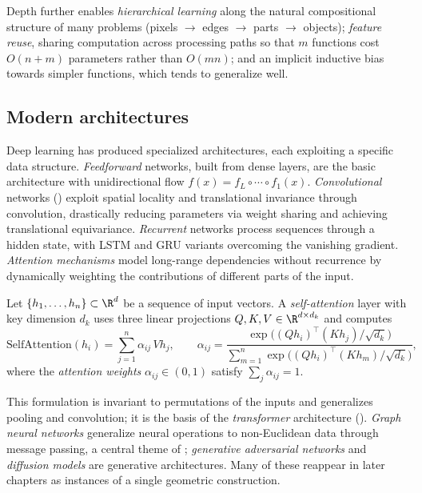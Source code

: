 Depth further enables \emph{hierarchical learning} along the natural
compositional structure of many problems (pixels $\to$ edges $\to$ parts $\to$
objects); \emph{feature reuse}, sharing computation across processing paths so
that $m$ functions cost $O(n + m)$ parameters rather than $O(mn)$; and an
implicit inductive bias towards simpler functions, which tends to generalize
well.

\subsection{Modern architectures}
\label{sec:found:modern}

Deep learning has produced specialized architectures, each exploiting a specific
data structure. \emph{Feedforward} networks, built from dense layers, are the
basic architecture with unidirectional flow $f(x) = f_L \circ \cdots \circ
f_1(x)$. \emph{Convolutional} networks () exploit spatial locality
and translational invariance through convolution, drastically reducing parameters
via weight sharing and achieving translational equivariance. \emph{Recurrent}
networks process sequences through a hidden state, with LSTM and GRU variants
overcoming the vanishing gradient. \emph{Attention mechanisms} model long-range
dependencies without recurrence by dynamically weighting the contributions of
different parts of the input.

\begin{definition}
\label{def:found:attention}
Let $\{h_1, \ldots, h_n\} \subset \R^d$ be a sequence of input vectors. A
\emph{self-attention} layer with key dimension $d_k$ uses three linear
projections $Q, K, V \in \R^{d \times d_k}$ and computes
\[
  \mathrm{SelfAttention}(h_i) = \sum_{j=1}^n \alpha_{ij}\, V h_j, \qquad
  \alpha_{ij} = \frac{\exp\bigl((Qh_i)^\top(Kh_j)/\sqrt{d_k}\bigr)}
  {\sum_{m=1}^n \exp\bigl((Qh_i)^\top(Kh_m)/\sqrt{d_k}\bigr)},
\]
where the \emph{attention weights} $\alpha_{ij} \in (0,1)$ satisfy
$\sum_j \alpha_{ij} = 1$.
\end{definition}

This formulation is invariant to permutations of the inputs and generalizes
pooling and convolution; it is the basis of the \emph{transformer} architecture
(). \emph{Graph neural networks} generalize neural operations to
non-Euclidean data through message passing, a central theme of ;
\emph{generative adversarial networks} and \emph{diffusion models} are generative
architectures. Many of these reappear in later chapters as instances of a single
geometric construction.

